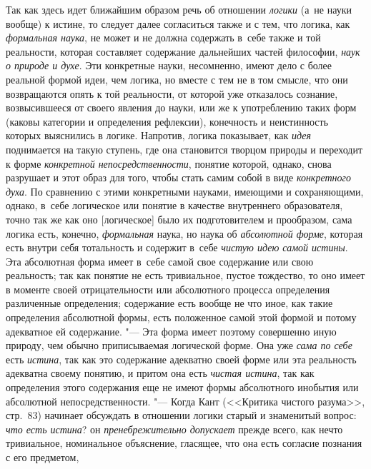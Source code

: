 Так как здесь идет ближайшим образом речь об отношении
{\em логики} (а~не науки
вообще) к истине, то следует далее согласиться также и с тем, что логика,
как {\em формальная наука},
не может и не должна содержать в~себе также и той реальности,
которая составляет содержание дальнейших частей философии,
{\em наук о природе и духе}.
Эти конкретные науки, несомненно, имеют дело с более реальной
формой идеи, чем логика, но вместе с тем не в том смысле, что они
возвращаются опять к той реальности, от которой уже отказалось сознание,
возвысившееся от своего явления до науки, или же к употреблению таких форм
(каковы категории и определения рефлексии), конечность и неистинность
которых выяснились в логике. Напротив, логика показывает, как
{\em идея} поднимается на
такую ступень, где она становится творцом природы и переходит к форме
{\em конкретной непосредственности},
понятие которой, однако, снова разрушает и этот образ для
того, чтобы стать самим собой в виде
{\em конкретного духа}.
По сравнению с этими конкретными науками, имеющими и
сохраняющими, однако, в~себе логическое или понятие в качестве внутреннего
образователя, точно так же как оно [логическое] было их подготовителем и
прообразом, сама логика есть, конечно,
{\em формальная} наука,
но наука об {\em абсолютной форме},
которая есть внутри себя тотальность и содержит в~себе
{\em чистую идею самой истины}.
Эта абсолютная форма имеет в~себе самой свое содержание или
свою реальность; так как понятие не есть тривиальное, пустое тождество, то
оно имеет в моменте своей отрицательности или абсолютного процесса
определения различенные определения; содержание есть вообще не что иное,
как такие определения абсолютной формы, есть положенное самой этой формой и
потому адекватное ей содержание. "--- Эта форма имеет поэтому
совершенно иную природу, чем обычно приписываемая логической
форме. Она уже {\em сама по себе}
есть {\em истина},
так как это содержание адекватно своей форме или эта
реальность адекватна своему понятию, и притом она есть
{\em чистая истина}, так
как определения этого содержания еще не имеют формы абсолютного инобытия
или абсолютной непосредственности. "--- Когда Кант (<<Критика
чистого разума>>, стр.~83) начинает обсуждать в отношении логики старый и
знаменитый вопрос: {\em что есть
истина}? он
{\em пренебрежительно допускает}
прежде всего, как нечто тривиальное, номинальное
объяснение, гласящее, что она есть согласие познания с его
предметом,
